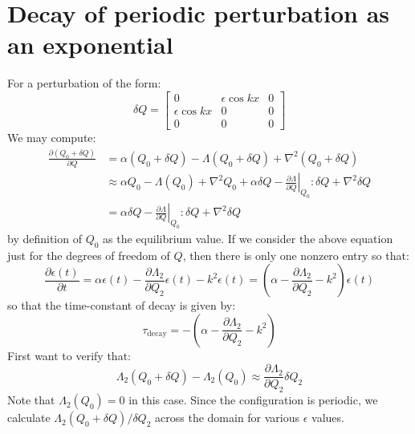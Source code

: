 \documentclass[reqno]{article}
\begin{document}
\section{Decay of periodic perturbation as an exponential}
For a perturbation of the form:
\begin{equation}
    \delta Q
    =
    \begin{bmatrix}
        0 &\epsilon \cos kx &0 \\
        \epsilon \cos kx &0 &0 \\
        0 &0 &0
    \end{bmatrix}
\end{equation}
We may compute:
\begin{equation}
    \begin{split}
        \frac{\partial (Q_0 + \delta Q)}{\partial Q}
        &=
        \alpha (Q_0 + \delta Q) 
        - \Lambda(Q_0 + \delta Q) 
        + \nabla^2 (Q_0 + \delta Q) \\
        &\approx
        \alpha Q_0 - \Lambda (Q_0) + \nabla^2 Q_0
        + \alpha \delta Q - \left. \frac{\partial \Lambda}{\partial Q} \right|_{Q_0} : \delta Q + \nabla^2 \delta Q \\
        &= \alpha \delta Q - \left. \frac{\partial \Lambda}{\partial Q} \right|_{Q_0} : \delta Q + \nabla^2 \delta Q
    \end{split}
\end{equation}
by definition of $Q_0$ as the equilibrium value. 
If we consider the above equation just for the degrees of freedom of $Q$, then there is only one nonzero entry so that:
\begin{equation}
    \frac{\partial \epsilon(t)}{\partial t}
    =
    \alpha \epsilon(t) - \frac{\partial \Lambda_2}{\partial Q_2} \epsilon(t) - k^2 \epsilon(t)
    =
    \left(\alpha - \frac{\partial \Lambda_2}{\partial Q_2} - k^2 \right) \epsilon(t)
\end{equation}
so that the time-constant of decay is given by:
\begin{equation}
    \tau_\text{decay}
    =
    -\left(\alpha - \frac{\partial \Lambda_2}{\partial Q_2} - k^2 \right)
\end{equation}
First want to verify that:
\begin{equation}
    \Lambda_2 (Q_0 + \delta Q) - \Lambda_2(Q_0)
    \approx
    \frac{\partial \Lambda_2}{\partial Q_2} \delta Q_2
\end{equation}
Note that $\Lambda_2(Q_0) = 0$ in this case.
Since the configuration is periodic, we calculate $\Lambda_2(Q_0 + \delta Q) / \delta Q_2$ across the domain for various $\epsilon$ values.
\end{document}
